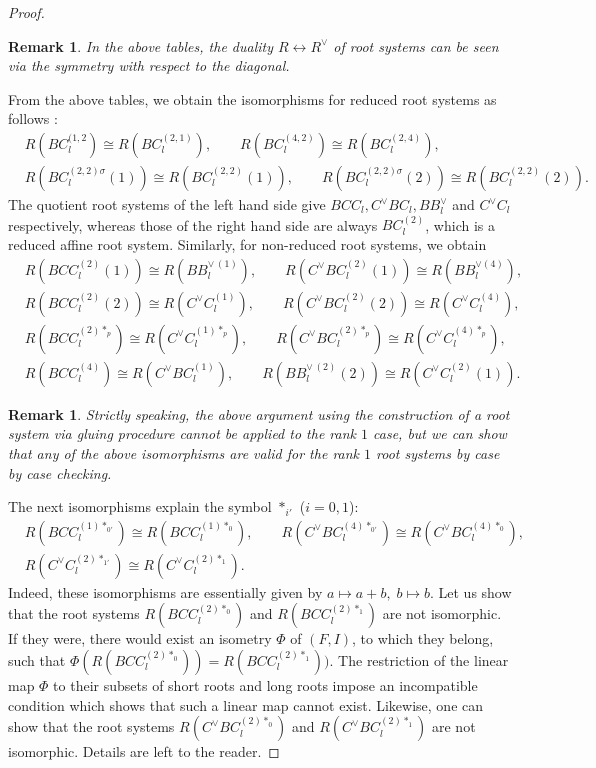 \documentclass[11pt]{amsart}
\newtheorem{rem}[thm]{Remark}%
\begin{document}
\begin{proof}
\begin{rem} In the above tables, the duality $R \leftrightarrow R^\vee$ of root systems can be seen via the symmetry with respect to the diagonal. 
\end{rem}
From the above tables, we obtain the isomorphisms for reduced root systems as follows : 
\begin{align*}
 &R(BC_l^{(1,2}) \cong R(BC_l^{(2,1)}), \qquad R(BC_l^{(4,2)}) \cong R(BC_l^{(2,4)}), \\
 &R(BC_l^{(2,2)\sigma}(1)) \cong R(BC_l^{(2,2)}(1)), \qquad 
    R(BC_l^{(2,2)\sigma}(2)) \cong R(BC_l^{(2,2)}(2)). 
\end{align*}
The quotient root systems of the left hand side give $BCC_l, C^\vee BC_l, BB_l^\vee$ and $C^\vee C_l$ respectively, whereas those of the right hand side are always $BC_l^{(2)}$, which is a reduced affine root system.  
Similarly, for non-reduced root systems, we obtain
\begin{align*}
& R(BCC_l^{(2)}(1)) \cong R(BB_l^{\vee\, (1)}), \qquad 
    R(C^\vee BC_l^{(2)}(1)) \cong R(BB_l^{\vee (4)}), \\
& R(BCC_l^{(2)}(2)) \cong R(C^\vee C_l^{(1)}),  \qquad
   R(C^\vee BC_l^{(2)}(2)) \cong R(C^\vee C_l^{(4)}), \\
& R(BCC_l^{(2)\ast_p}) \cong R(C^\vee C_l^{(1)\ast_p}), \qquad 
   R(C^\vee BC_l^{(2)\ast_p}) \cong R(C^\vee C_l^{(4)\ast_p}), \\
& R(BCC_l^{(4)}) \cong R(C^\vee BC_l^{(1)}), \qquad
    R(BB_l^{\vee\, (2)}(2)) \cong R(C^\vee C_l^{(2)}(1)).
\end{align*}
\begin{rem} Strictly speaking, the above argument using the construction of a root system via gluing procedure cannot be applied to the rank $1$ case, but we can show that any of the above isomorphisms are valid for the rank $1$ root systems by case by case checking.
\end{rem}
The next isomorphisms explain the symbol $\ast_{i'}$ ($i=0,1$):
\begin{align*}
& R(BCC_l^{(1)\ast_{0'}}) \cong R(BCC_l^{(1)\ast_0}), \qquad 
R(C^\vee BC_l^{(4)\ast_{0'}}) \cong R(C^\vee BC_l^{(4)\ast_0}), \\
& R(C^\vee C_l^{(2)\ast_{1'}}) \cong R(C^\vee C_l^{(2)\ast_{1}}).
\end{align*}
Indeed, these isomorphisms are essentially given by $a \mapsto a+b, \; b \mapsto b$. 
Let us show that the root systems $R(BCC_l^{(2)\ast_0})$ and $R(BCC_l^{(2)\ast_1})$ are not isomorphic. If they were, there would exist an isometry $\Phi$ of $(F,I)$, to which they belong, such that $\Phi(R(BCC_l^{(2)\ast_0}))=R(BCC_l^{(2)\ast_1}))$. The restriction of the linear map $\Phi$ to their subsets of short roots and long roots impose an incompatible condition which shows that such a linear map cannot exist. Likewise, one can show that  the root systems $R(C^\vee BC_l^{(2)\ast_0})$ and $R(C^\vee BC_l^{(2)\ast_1})$ are not isomorphic.  Details are left to the reader.  



\end{proof}
\end{document}
